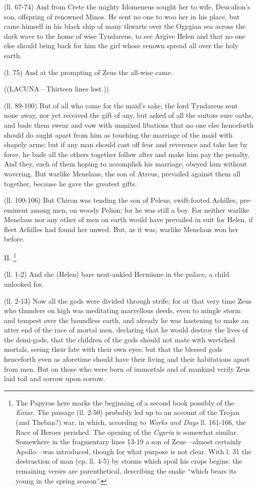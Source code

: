 (ll. 67-74) And from Crete the mighty Idomeneus sought her to wife,
Deucalion’s son, offspring of renowned Minos. He sent no one to woo her
in his place, but came himself in his black ship of many thwarts over the
Ogygian sea across the dark wave to the home of wise Tyndareus, to see Argive
Helen and that no one else should bring back for him the girl whose renown
spread all over the holy earth.

(l. 75) And at the prompting of Zeus the all-wise came.

((LACUNA—Thirteen lines lost.))

(ll. 89-100) But of all who came for the maid’s sake, the lord Tyndareus
sent none away, nor yet received the gift of any, but asked of all the suitors
sure oaths, and bade them swear and vow with unmixed libations that no one else
henceforth should do aught apart from him as touching the marriage of the maid
with shapely arms; but if any man should cast off fear and reverence and take
her by force, he bade all the others together follow after and make him pay the
penalty. And they, each of them hoping to accomplish his marriage, obeyed him
without wavering. But warlike Menelaus, the son of Atreus, prevailed against
them all together, because he gave the greatest gifts.

(ll. 100-106) But Chiron was tending the son of Peleus, swift-footed Achilles,
pre-eminent among men, on woody Pelion; for he was still a boy. For neither
warlike Menelaus nor any other of men on earth would have prevailed in suit for
Helen, if fleet Achilles had found her unwed. But, as it was, warlike Menelaus
won her before.

II. \footnote{The Papyrus here marks the
beginning of a second book possibly of the \emph{Eoiae}. The passage (ll. 2-50)
probably led up to an account of the Trojan (and Theban?) war, in which,
according to \emph{Works and Days} ll. 161-166, the Race of Heroes perished.
The opening of the \emph{Cypria} is somewhat similar. Somewhere in the
fragmentary lines 13-19 a son of Zeus—almost certainly Apollo—was
introduced, though for what purpose is not clear. With l. 31 the destruction of
man (cp. ll. 4-5) by storms which spoil his crops begins: the remaining verses
are parenthetical, describing the snake “which bears its young in the
spring season”.}

(ll. 1-2) And she (Helen) bare neat-ankled Hermione in the palace, a child
unlooked for.

(ll. 2-13) Now all the gods were divided through strife; for at that very time
Zeus who thunders on high was meditating marvellous deeds, even to mingle storm
and tempest over the boundless earth, and already he was hastening to make an
utter end of the race of mortal men, declaring that he would destroy the lives
of the demi-gods, that the children of the gods should not mate with wretched
mortals, seeing their fate with their own eyes; but that the blessed gods
henceforth even as aforetime should have their living and their habitations
apart from men. But on those who were born of immortals and of mankind verily
Zeus laid toil and sorrow upon sorrow.

